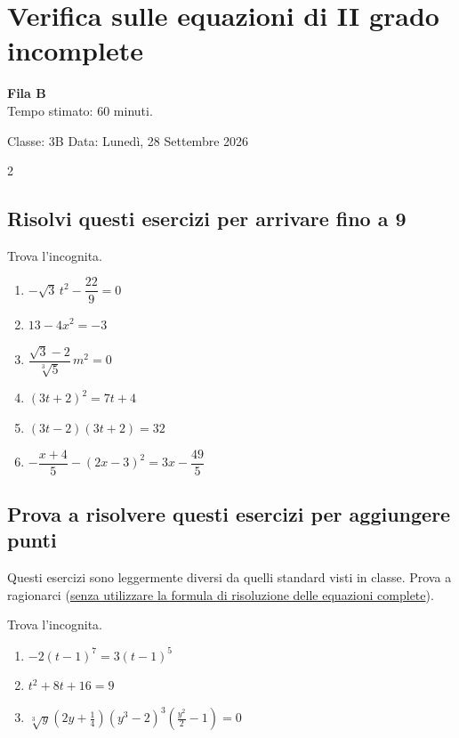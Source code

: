 \documentclass[11pt]{report}
\begin{document}
\chapter*{Verifica sulle equazioni di II grado incomplete}
\begin{flushright}
    \textbf{Fila B}\\
    Tempo stimato: 60 minuti.
\end{flushright}

\begin{flushright}
    Classe: 3B \quad Data: Lunedì, 28 Settembre 2026
\end{flushright} 

\vspace{0.8em}
\regoladoro
\begin{paracol}{2}
\section*{Risolvi questi esercizi per arrivare fino a 9}
Trova l'incognita.
\begin{enumerate}
    \item $-\sqrt3\,t^2-\dfrac{22}{9}=0$
    \item $13-4x^2=-3$
    \item $\dfrac{\sqrt3-2}{\sqrt[3]5}\,m^2=0$
    \item $(3t+2)^2=7t+4$
    \item $(3t-2)(3t+2)=32$
    \item $-\dfrac{x+4}{5} - (2x-3)^2 = 3x - \dfrac{49}{5}$
\end{enumerate}
\switchcolumn
\section*{Prova a risolvere questi esercizi per aggiungere punti}
Questi esercizi sono leggermente diversi da quelli standard visti in classe. Prova a ragionarci (\ul{senza utilizzare la formula di risoluzione delle equazioni complete}).

Trova l'incognita.

\begin{enumerate}
    \item[7.] $-2(t-1)^7=3(t-1)^5$
    \item[8.] $t^2+8t+16=9$
    \item[9.] $\sqrt[3] y\left(2y+\frac14\right)(y^3-2)^3\left(\frac {y^2}2 -1\right)=0$
\end{enumerate}
\end{paracol}
\end{document}
